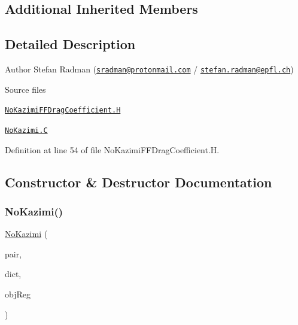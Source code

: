 \subsection*{Additional Inherited Members}


\subsection{Detailed Description}
Author Stefan Radman (\href{mailto:sradman@protonmail.com}{\tt sradman@protonmail.\+com} / \href{mailto:stefan.radman@epfl.ch}{\tt stefan.\+radman@epfl.\+ch}) 

\label{_Description}%
 \begin{DoxyParagraph}{Source files}

\begin{DoxyItemize}
\item \href{../../../home/carlo/data/GeN-Foam/GeN-Foam_ffn/GeN-Foam/GeN-Foam/classes/thermalHydraulics/src/physicsModels/dragModels/FFDragCoefficientModels/NoKazimi/NoKazimiFFDragCoefficient.H}{\tt No\+Kazimi\+F\+F\+Drag\+Coefficient.\+H} 
\item \href{../../../home/carlo/data/GeN-Foam/GeN-Foam_ffn/GeN-Foam/GeN-Foam/classes/thermalHydraulics/src/physicsModels/dragModels/FFDragCoefficientModels/NoKazimi/NoKazimi.C}{\tt No\+Kazimi.\+C} 
\end{DoxyItemize}
\end{DoxyParagraph}


Definition at line 54 of file No\+Kazimi\+F\+F\+Drag\+Coefficient.\+H.



\subsection{Constructor \& Destructor Documentation}
\mbox{\label{classFoam_1_1FFDragCoefficientModels_1_1NoKazimi_ae108db9c96c6b2362c958ffd1eedc839}} 
\subsubsection{\texorpdfstring{No\+Kazimi()}{NoKazimi()}}
{\footnotesize\ttfamily \hyperlink{classFoam_1_1FFDragCoefficientModels_1_1NoKazimi}{No\+Kazimi} (\begin{DoxyParamCaption}\item[{const \hyperlink{classFoam_1_1FFPair}{F\+F\+Pair} \&}]{pair,  }\item[{const dictionary \&}]{dict,  }\item[{const object\+Registry \&}]{obj\+Reg }\end{DoxyParamCaption})}



